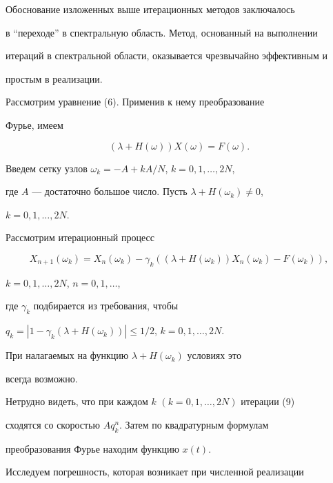 Обоснование изложенных выше итерационных методов заключалось


в ``переходе'' в спектральную область. Метод, основанный на выполнении


итераций в спектральной области, оказывается чрезвычайно эффективным и


простым в реализации.





Рассмотрим уравнение (6). Применив к нему преобразование


Фурье, имеем


$$


(\lambda+H(\omega)) X(\omega)=F(\omega).


$$


Введем сетку узлов $\omega_k=-A+kA/N$, $k=0,1,\dotsc,2N$,


где $A$ --- достаточно большое число. Пусть $\lambda+ H(\omega_k) \ne 0$,


$k=0,1,\dotsc,2N$.





Рассмотрим итерационный процесс


\begin{equation}


X_{n+1}(\omega_k)=X_n (\omega_k)-\gamma_k


((\lambda + H(\omega_k)) X_n(\omega_k)-F (\omega_k)),


\end{equation}


$k=0,1,\dotsc,2N$, $n=0,1,\dotsc$,


где $\gamma_k $ подбирается из требования, чтобы


$q_k =|1-\gamma_k (\lambda + H(\omega_k))|


\le 1/2$, $k=0,1,\dotsc,2N$.


При налагаемых на функцию $ \lambda + H(\omega_k) $ условиях это


всегда возможно.





Нетрудно видеть, что при каждом $k$ $(k=0,1,\dotsc,2N)$ итерации (9)


сходятся со скоростью $ Aq_k^n$. Затем по квадратурным формулам


преобразования Фурье находим функцию $ x(t)$.





Исследуем погрешность, которая возникает при численной реализации


